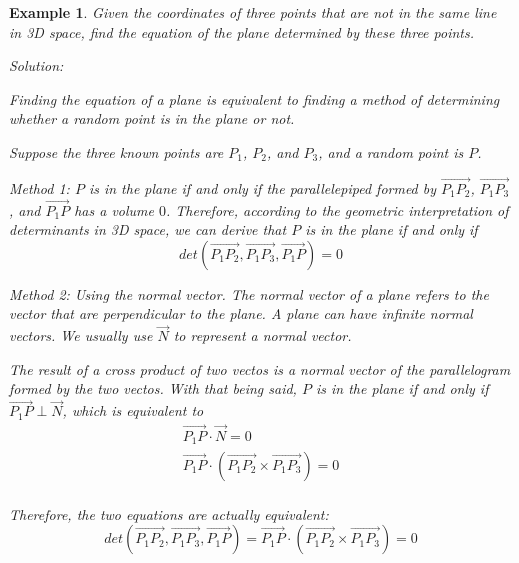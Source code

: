 \documentclass{article}
\newtheorem{example}{Example}
\begin{document}
\begin{example}
Given the coordinates of three points that are not in the same line in 3D space,
find the equation of the plane determined by these three points.

Solution:

Finding the equation of a plane is equivalent to finding a method of
determining whether a random point is in the plane or not.

Suppose the three known points are $P_1$, $P_2$, and $P_3$, and a random point
is $P$.

Method 1: $P$ is in the plane if and only if the parallelepiped formed by
$\vec{P_1P_2}$, $\vec{P_1P_3}$, and $\vec{P_1P}$ has a volume $0$. Therefore,
according to the geometric interpretation of determinants in 3D space, we can
derive that $P$ is in the plane if and only if
\[
  det(\vec{P_1P_2}, \vec{P_1P_3}, \vec{P_1P}) = 0
\]

Method 2: Using the normal vector. The normal vector of a plane refers to the
vector that are perpendicular to the plane. A plane can have infinite normal
vectors. We usually use $\vec{N}$ to represent a normal vector. 

The result of a cross product of two vectos is a normal vector of the
parallelogram formed by the two vectos. With that being said, $P$ is in the
plane if and only if $\vec{P_1P} \perp \vec{N}$, which is equivalent to
\begin{gather*}
  \vec{P_1P} \cdot \vec{N} = 0 \\
  \vec{P_1P} \cdot (\vec{P_1P_2} \times \vec{P_1P_3}) = 0 \\
\end{gather*}

Therefore, the two equations are actually equivalent:
\[
  det(\vec{P_1P_2}, \vec{P_1P_3}, \vec{P_1P}) = \vec{P_1P} \cdot (\vec{P_1P_2} \times \vec{P_1P_3}) = 0
\]

\end{example}
\end{document}
